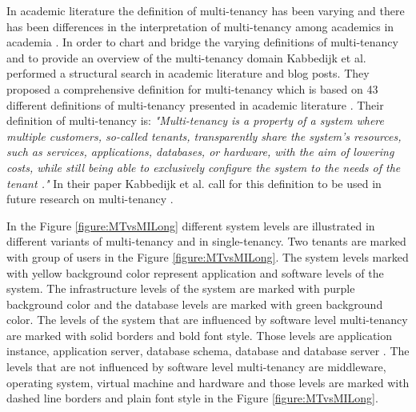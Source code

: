 \documentclass[conference]{sasmoota2017}
\begin{document}
In academic literature the definition of multi-tenancy has been varying and there has been differences in the interpretation of multi-tenancy among academics in academia \cite{Kabbedijk2015:Defining}. In order to chart and bridge the varying definitions of multi-tenancy and to provide an overview of the multi-tenancy domain Kabbedijk et al. \cite{Kabbedijk2015:Defining} performed a structural search in academic literature and blog posts. They proposed a comprehensive definition for multi-tenancy which is based on 43 different definitions of multi-tenancy presented in academic literature \cite{Kabbedijk2015:Defining}. Their definition of multi-tenancy is: \textit{"Multi-tenancy is a property of a system where multiple customers, so-called tenants, transparently share the system's resources, such as services, applications, databases, or hardware, with the aim of lowering costs, while still being able to exclusively configure the system to the needs of the tenant \cite{Kabbedijk2015:Defining}."} In their paper Kabbedijk et al. call for this definition to be used in future research on multi-tenancy \cite{Kabbedijk2015:Defining}.

In the Figure \ref{figure:MTvsMILong} different system levels are illustrated in different variants of multi-tenancy and in single-tenancy. Two tenants are marked with group of users in the Figure \ref{figure:MTvsMILong}. The system levels marked with yellow background color represent application and software levels of the system. The infrastructure levels of the system are marked with purple background color and the database levels are marked with green background color. The levels of the system that are influenced by software level multi-tenancy are marked with solid borders and bold font style. Those levels are application instance, application server, database schema, database and database server \cite{Kabbedijk2015:Defining}. The levels that are not influenced by software level multi-tenancy are middleware, operating system, virtual machine and hardware and those levels are marked with dashed line borders and plain font style in the Figure \ref{figure:MTvsMILong}. 
\end{document}
